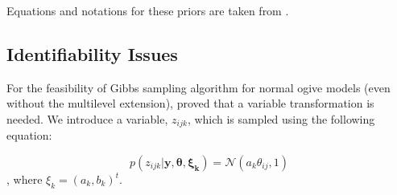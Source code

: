 \documentclass[12pt]{article}
\begin{document}
Equations and notations for these priors are taken from \cite{fox2007multilevel}.

\subsection{Identifiability Issues}

For the feasibility of Gibbs sampling algorithm for normal ogive models (even without the multilevel extension), \cite{albert1992bayesian} proved that a variable transformation is needed. We introduce a variable, $z_{ijk}$, which is sampled using the following equation:

\begin{equation*}
    p(z_{ijk}| \boldsymbol{y, \theta, \xi_k}) = \mathcal{N}(a_k \theta_{ij}, 1)
\end{equation*},
where $\xi_k = (a_k, b_k)^t.$
\end{document}
